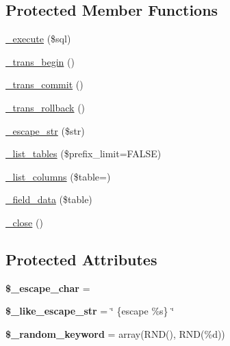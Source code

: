 \subsection*{Protected Member Functions}
\begin{DoxyCompactItemize}
\item 
\mbox{\hyperlink{class_c_i___d_b__odbc__driver_a16be72853726c6da73cb9fce8031cd5a}{\+\_\+execute}} (\$sql)
\item 
\mbox{\hyperlink{class_c_i___d_b__odbc__driver_a69523257786e9806d061ffaa161b6d86}{\+\_\+trans\+\_\+begin}} ()
\item 
\mbox{\hyperlink{class_c_i___d_b__odbc__driver_afff8139de398ed9760487762768a7633}{\+\_\+trans\+\_\+commit}} ()
\item 
\mbox{\hyperlink{class_c_i___d_b__odbc__driver_acddb1326f204dc4e4f44515c757e892c}{\+\_\+trans\+\_\+rollback}} ()
\item 
\mbox{\hyperlink{class_c_i___d_b__odbc__driver_a82845dc079a13038e5cac8261f367ccd}{\+\_\+escape\+\_\+str}} (\$str)
\item 
\mbox{\hyperlink{class_c_i___d_b__odbc__driver_a2cb15dc00978503e666b85443352e7b9}{\+\_\+list\+\_\+tables}} (\$prefix\+\_\+limit=F\+A\+L\+SE)
\item 
\mbox{\hyperlink{class_c_i___d_b__odbc__driver_aaad9fcfe553decb249097b9c2e06401a}{\+\_\+list\+\_\+columns}} (\$table=\textquotesingle{}\textquotesingle{})
\item 
\mbox{\hyperlink{class_c_i___d_b__odbc__driver_a11cf239b1f5eec67182813400bc3fcc1}{\+\_\+field\+\_\+data}} (\$table)
\item 
\mbox{\hyperlink{class_c_i___d_b__odbc__driver_acc26fae36c67ad8489dcafa939ed287e}{\+\_\+close}} ()
\end{DoxyCompactItemize}
\subsection*{Protected Attributes}
\begin{DoxyCompactItemize}
\item 
\mbox{\label{class_c_i___d_b__odbc__driver_aa7d2f9f4ee2b285dd95c8e139ab39478}} 
{\bfseries \$\+\_\+escape\+\_\+char} = \textquotesingle{}\textquotesingle{}
\item 
\mbox{\label{class_c_i___d_b__odbc__driver_adaf861cd41627ec858efce7166d81083}} 
{\bfseries \$\+\_\+like\+\_\+escape\+\_\+str} = \char`\"{} \{escape \textquotesingle{}\%s\textquotesingle{}\} \char`\"{}
\item 
\mbox{\label{class_c_i___d_b__odbc__driver_a741a86bac398254a82486629ca889628}} 
{\bfseries \$\+\_\+random\+\_\+keyword} = array(\textquotesingle{}R\+ND()\textquotesingle{}, \textquotesingle{}R\+ND(\%d)\textquotesingle{})
\end{DoxyCompactItemize}


